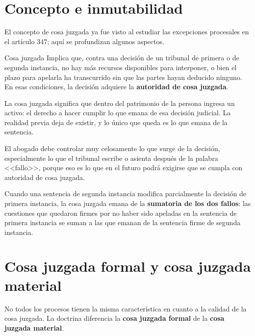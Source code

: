 \documentclass[12pt,oneside]{book}
\begin{document}

\section{Concepto e inmutabilidad}

El concepto de cosa juzgada ya fue visto al estudiar las excepciones procesales en el artículo 347; aquí se profundizan algunos aspectos.

\begin{definition}{Cosa juzgada}
Implica que, contra una decisión de un tribunal de primera o de segunda instancia, no hay más recursos disponibles para interponer, o bien el plazo para apelarla ha transcurrido sin que las partes hayan deducido ninguno. En esas condiciones, la decisión adquiere la \textbf{autoridad de cosa juzgada}.
\end{definition}

\begin{important}
La cosa juzgada significa que dentro del patrimonio de la persona ingresa un activo: el derecho a hacer cumplir lo que emana de esa decisión judicial. La realidad previa deja de existir, y lo único que queda es lo que emana de la sentencia.
\end{important}

El abogado debe controlar muy celosamente lo que surge de la decisión, especialmente lo que el tribunal escribe o asienta después de la palabra <<fallo>>, porque eso es lo que en el futuro podrá exigirse que se cumpla con autoridad de cosa juzgada.

Cuando una sentencia de segunda instancia modifica parcialmente la decisión de primera instancia, la cosa juzgada emana de la \textbf{sumatoria de los dos fallos}: las cuestiones que quedaron firmes por no haber sido apeladas en la sentencia de primera instancia se suman a las que emanan de la sentencia firme de segunda instancia.

\section{Cosa juzgada formal y cosa juzgada material}

No todos los procesos tienen la misma característica en cuanto a la calidad de la cosa juzgada. La doctrina diferencia la \textbf{cosa juzgada formal} de la \textbf{cosa juzgada material}.
\end{document}
